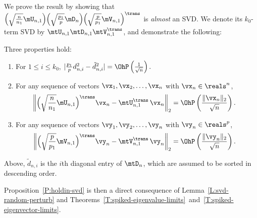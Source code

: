 We prove the result by showing that
\(
    \Big(
        \sqrt{\frac{n}{n_1}} \mU_{n,1}
    \Big)
    \Big(
        \sqrt{\frac{p_1}{p}} \mD_n
    \Big)
    \Big(
        \sqrt{\frac{p}{p_1}}
        \mV_{n,1}
    \Big)^\trans
\)
is \emph{almost} an SVD.  We denote its $k_0$-term SVD by 
$\mtU_{n,1} \mtD_{n,1} \mtV_{n,1}^\trans$, and demonstrate the following:
\begin{lemma}\label{L:svd-random-perturb}
    Three properties hold:
    \begin{enumerate}[(1)]
        \item For $1 \leq i \leq k_0$, 
            \(
                |\frac{p_1}{p} d_{n,i}^2 - \tilde d_{n,i}^2| 
                    = 
                        \OhP\left(\frac{1}{\sqrt{n}}\right).
            \)
        \item For any sequence of vectors $\vx_1, \vx_2, \ldots, \vx_n$
            with $\vx_n \in \reals^n$,
            \[
                \left\|
                    \Big(
                        \sqrt{\frac{n}{n_1}} \mU_{n,1}
                    \Big)^\trans
                    \vx_n
                    -
                    \mtU_{n,1}^\trans \,
                    \vx_n
                \right\|_2
                =
                \OhP\left(\frac{\| \vx_n \|_2}{\sqrt{n}}\right).
            \]
        \item For any sequence of vectors $\vy_1, \vy_2, \ldots, \vy_n$
            with $\vy_n \in \reals^p$,
            \[
                \left\|
                    \Big(
                        \sqrt{\frac{p}{p_1}} \mV_{n,1}
                    \Big)^\trans
                    \vy_n
                    -
                    \mtV_{n,1}^\trans \,
                    \vy_n
                \right\|_2
                =
                \OhP\left(\frac{\| \vy_n \|_2}{\sqrt{n}}\right).
            \]
    \end{enumerate}
    Above, $\tilde d_{n,i}$ is the $i$th diagonal entry of $\mtD_{n}$,
    which are assumed to be sorted in descending order.
\end{lemma}
\noindent
Proposition~\ref{P:holdin-svd} is then a direct consequence of
Lemma~\ref{L:svd-random-perturb} and
Theorems~\ref{T:spiked-eigenvalue-limits}~and~\ref{T:spiked-eigenvector-limits}.

